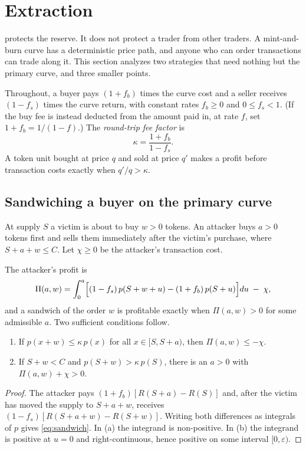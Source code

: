 \section{Extraction}\label{sec:extraction}

 protects the reserve. It does not protect a trader from other traders. A mint-and-burn curve has a deterministic price path, and anyone who can order transactions can trade along it. This section analyzes two strategies that need nothing but the primary curve, and three smaller points.

Throughout, a buyer pays $(1+f_b)$ times the curve cost and a seller receives $(1-f_s)$ times the curve return, with constant rates $f_b\ge0$ and $0\le f_s<1$. (If the buy fee is instead deducted from the amount paid in, at rate $f$, set $1+f_b=1/(1-f)$.) The \emph{round-trip fee factor} is
\[
\kappa=\frac{1+f_b}{1-f_s}.
\]
A token unit bought at price $q$ and sold at price $q'$ makes a profit before transaction costs exactly when $q'/q>\kappa$.

\subsection{Sandwiching a buyer on the primary curve}\label{sec:sandwich}

At supply $S$ a victim is about to buy $w>0$ tokens. An attacker buys $a>0$ tokens first and sells them immediately after the victim's purchase, where $S+a+w\le C$. Let $\chi\ge0$ be the attacker's transaction cost.

\begin{proposition}\label{prop:sandwich}
The attacker's profit is
\begin{equation}\label{eq:sandwich}
\Pi(a,w)=\int_0^a\Bigl[(1-f_s)\,p(S+w+u)-(1+f_b)\,p(S+u)\Bigr]du\;-\;\chi ,
\end{equation}
and a sandwich of the order $w$ is profitable exactly when $\Pi(a,w)>0$ for some admissible $a$. Two sufficient conditions follow.
\begin{enumerate}[label=(\alph*)]
\item If $p(x+w)\le\kappa\,p(x)$ for all $x\in[S,S+a)$, then $\Pi(a,w)\le -\chi$.
\item If $S+w<C$ and $p(S+w)>\kappa\,p(S)$, there is an $a>0$ with $\Pi(a,w)+\chi>0$.
\end{enumerate}
\end{proposition}
\begin{proof}
The attacker pays $(1+f_b)[R(S+a)-R(S)]$ and, after the victim has moved the supply to $S+a+w$, receives $(1-f_s)[R(S+a+w)-R(S+w)]$. Writing both differences as integrals of $p$ gives \eqref{eq:sandwich}. In (a) the integrand is non-positive. In (b) the integrand is positive at $u=0$ and right-continuous, hence positive on some interval $[0,\varepsilon)$.
\end{proof}

